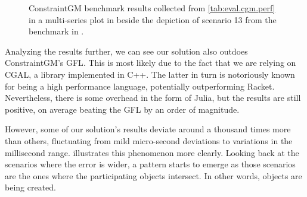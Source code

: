 \begin{figure}[htb]
  \begin{subfigure}[t]{.6\linewidth}
    \centering
    \label{fig:eval.cgm.perf.plot}
  \end{subfigure}
  \hfill
  \begin{subfigure}[t]{.35\linewidth}
    \label{fig:eval.cgm.perf.13}
  \end{subfigure}
  \caption[ConstraintGM benchmarks and Scenario 13]{\label{fig:eval.cgm.perf}%
    ConstraintGM benchmark results collected from \cref{tab:eval.cgm.perf} in a
    multi-series plot in  beside the depiction
    of scenario 13 from the benchmark in .}
\end{figure}

Analyzing the results further, we can see our solution also outdoes
ConstraintGM's \ac{GFL}.  This is most likely due to the fact that we are
relying on \ac{CGAL}, a library implemented in C++.  The latter in turn is
notoriously known for being a high performance language, potentially
outperforming Racket.  Nevertheless, there is some overhead in the form of
Julia, but the results are still positive, on average beating the \ac{GFL} by an
order of magnitude.

However, some of our solution's results deviate around a thousand times more
than others, fluctuating from mild micro-second deviations to variations in the
millisecond range.   illustrates this phenomenon more
clearly.  Looking back at the scenarios where the error is wider, a pattern
starts to emerge as those scenarios are the ones where the participating objects
intersect.  In other words, objects are being created.

